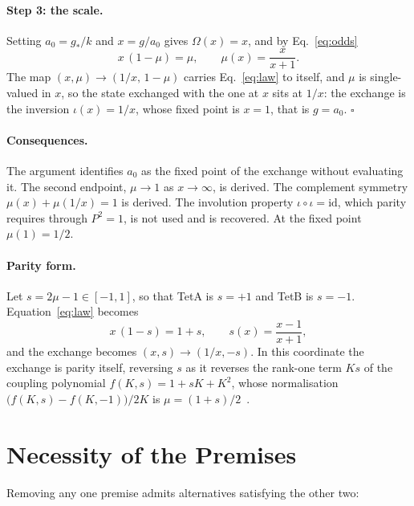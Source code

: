 \documentclass[twocolumn]{iopjournal}
\begin{document}
\paragraph{Step 3: the scale.} Setting $a_0 = g_\ast/k$ and
$x = g/a_0$ gives $\Omega(x) = x$, and by Eq.~\eqref{eq:odds}
\begin{equation}
  \boxed{x\,(1-\mu) = \mu, \qquad \mu(x) = \frac{x}{x+1}.}
  \label{eq:law}
\end{equation}
The map $(x,\mu) \to (1/x,\, 1-\mu)$ carries Eq.~\eqref{eq:law} to
itself, and $\mu$ is single-valued in $x$, so the state exchanged
with the one at $x$ sits at $1/x$: the exchange is the inversion
$\iota(x) = 1/x$, whose fixed point is $x = 1$, that is $g = a_0$.
\hfill $\square$

\paragraph{Consequences.} The argument identifies $a_0$ as the fixed
point of the exchange without evaluating it. The second endpoint,
$\mu \to 1$ as $x \to \infty$, is derived. The complement symmetry
$\mu(x) + \mu(1/x) = 1$ is derived. The involution property
$\iota \circ \iota = \mathrm{id}$, which parity requires through
$P^2 = 1$, is not used and is recovered. At the fixed point
$\mu(1) = 1/2$.

\paragraph{Parity form.} Let $s = 2\mu - 1 \in [-1,1]$, so that TetA
is $s = +1$ and TetB is $s = -1$. Equation~\eqref{eq:law} becomes
\begin{equation}
  x\,(1-s) = 1+s, \qquad s(x) = \frac{x-1}{x+1},
\end{equation}
and the exchange becomes $(x, s) \to (1/x, -s)$. In this coordinate
the exchange is parity itself, reversing $s$ as it reverses the
rank-one term $Ks$ of the coupling polynomial
$f(K,s) = 1 + sK + K^2$, whose normalisation
$\big(f(K,s) - f(K,-1)\big)/2K$ is
$\mu = (1+s)/2$~\cite{Nelson2026geometry}.


\section*{Necessity of the Premises}

Removing any one premise admits alternatives satisfying the other
two:
\end{document}
